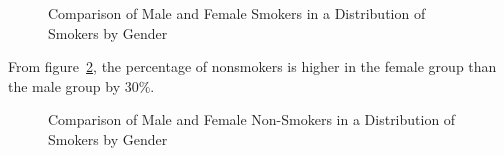 \begin{easylist}
\begin{figure}[!htb]
			\caption{Comparison of Male and Female Smokers in a Distribution of Smokers by Gender}
			\label{fig:distribution-of-smokers-by-gender:comparison-of-smokers}
		\end{figure}
		
		From figure~\ref{fig:distribution-of-smokers-by-gender:comparison-of-nonsmokers}, the percentage of nonsmokers is higher in the female group than the male group by 30\%.
		
		\begin{figure}[!htb]
			\centering
			
			\caption{Comparison of Male and Female Non-Smokers in a Distribution of Smokers by Gender}
			\label{fig:distribution-of-smokers-by-gender:comparison-of-nonsmokers}
		\end{figure}

\end{easylist}
